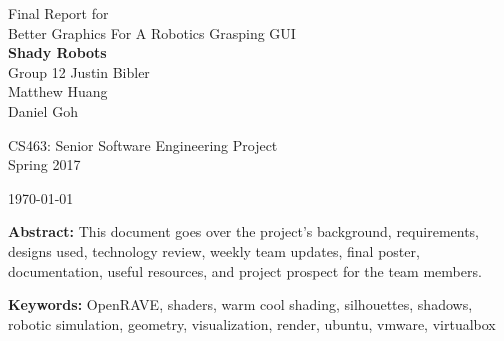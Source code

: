 \documentclass[10pt,journal,compsoc,draftclsnofoot]{IEEEtran}
\makeatletter
\renewenvironment{titlepage}
    {%
      \cleardoublepage
      \if@twocolumn
        \@restonecoltrue\onecolumn
      \else
        \@restonecolfalse\newpage
      \fi
      \thispagestyle{empty}%
    }%
    {\if@restonecol\twocolumn \else \newpage \fi
    }
\renewenvironment{titlepage}
    {%
      \cleardoublepage
      \if@twocolumn
        \@restonecoltrue\onecolumn
      \else
        \@restonecolfalse\newpage
      \fi
      \thispagestyle{empty}%
    }%
    {\if@restonecol\twocolumn \else \newpage \fi
     \if@twoside\else
     \fi
    }
\makeatother
\begin{document}
\onecolumn

\begin{titlepage}
\null
\vspace{15mm}

\begin{flushleft}
\begin{bfseries}
	\vskip2mm
	\Huge{Final Report for\\ Better Graphics For A Robotics Grasping GUI}\\
	\vspace{15mm}
	\textbf{\huge Shady Robots} \\
	\vskip2mm
	\large{Group 12}
	\vskip5mm
	\Large{Justin Bibler \\
	Matthew Huang \\
	Daniel Goh \\}
\end{bfseries}

\vspace{15mm}
\Large{CS463: Senior Software Engineering Project} \\
\Large{Spring 2017} \\

\vspace{5mm}

\today

\vfill

\begin{normalsize}
{\bf Abstract:}
This document goes over the project's background, requirements, designs used, technology review, weekly team updates, final poster, documentation, useful resources, and project prospect for the team members.

{\bf Keywords:} OpenRAVE, shaders, warm cool shading, silhouettes, shadows, robotic simulation, geometry, visualization, render, ubuntu, vmware, virtualbox
\end{normalsize}
\end{flushleft}

\newpage

\end{titlepage}
\end{document}
